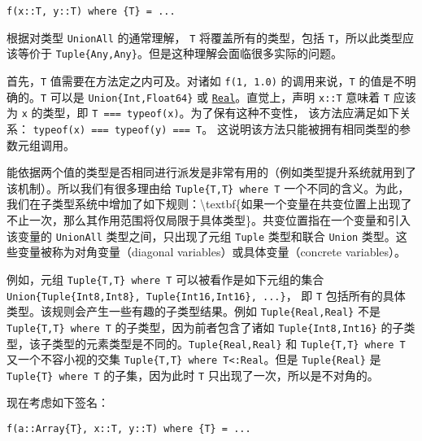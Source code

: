 \begin{verbatim}
f(x::T, y::T) where {T} = ...
\end{verbatim}



根据对类型 \texttt{UnionAll} 的通常理解， \texttt{T} 将覆盖所有的类型，包括 \texttt{T}，所以此类型应该等价于 \texttt{Tuple\{Any,Any\}}。但是这种理解会面临很多实际的问题。



首先，\texttt{T} 值需要在方法定之内可及。对诸如 \texttt{f(1, 1.0)} 的调用来说，\texttt{T} 的值是不明确的。\texttt{T} 可以是 \texttt{Union\{Int,Float64\}} 或 \hyperlink{6175959395021454412}{\texttt{Real}}。直觉上，声明 \texttt{x::T} 意味着 \texttt{T} 应该为 \texttt{x} 的类型，即 \texttt{T === typeof(x)}。为了保有这种不变性， 该方法应满足如下关系： \texttt{typeof(x) === typeof(y) === T}。 这说明该方法只能被拥有相同类型的参数元组调用。



能依据两个值的类型是否相同进行派发是非常有用的（例如类型提升系统就用到了该机制）。所以我们有很多理由给 \texttt{Tuple\{T,T\} where T} 一个不同的含义。为此，我们在子类型系统中增加了如下规则：{\textbackslash}textbf\{如果一个变量在共变位置上出现了不止一次，那么其作用范围将仅局限于具体类型\}。共变位置指在一个变量和引入该变量的 \texttt{UnionAll} 类型之间，只出现了元组 \texttt{Tuple} 类型和联合 \texttt{Union} 类型。这些变量被称为对角变量（diagonal variables）或具体变量（concrete variables）。



例如，元组 \texttt{Tuple\{T,T\} where T} 可以被看作是如下元组的集合 \texttt{Union\{Tuple\{Int8,Int8\}, Tuple\{Int16,Int16\}, ...\}}， 即 \texttt{T} 包括所有的具体类型。该规则会产生一些有趣的子类型结果。例如 \texttt{Tuple\{Real,Real\}} 不是 \texttt{Tuple\{T,T\} where T} 的子类型，因为前者包含了诸如 \texttt{Tuple\{Int8,Int16\}} 的子类型，该子类型的元素类型是不同的。\texttt{Tuple\{Real,Real\}} 和 \texttt{Tuple\{T,T\} where T} 又一个不容小视的交集 \texttt{Tuple\{T,T\} where T<:Real}。但是 \texttt{Tuple\{Real\}} 是 \texttt{Tuple\{T\} where T} 的子集，因为此时 \texttt{T} 只出现了一次，所以是不对角的。



现在考虑如下签名：




\begin{verbatim}
f(a::Array{T}, x::T, y::T) where {T} = ...
\end{verbatim}




